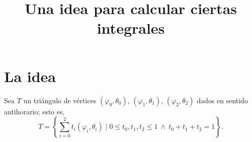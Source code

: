 \documentclass[reqno]{amsart}
\begin{document}
\title{Una idea para calcular ciertas integrales}
\maketitle

\section{La idea}

Sea $T$ un triángulo de vértices $(\varphi_0, \theta_0)$, $(\varphi_1, \theta_1)$, $(\varphi_2, \theta_2)$ dados en sentido antihorario; esto es,
%
\begin{equation}\label{T}
T = \left\{ \sum_{i=0}^2 t_i (\varphi_i, \theta_i) \mid 0 \leq t_0, t_1, t_2 \leq 1 \ \wedge \ t_0+t_1+t_2=1 \right\}.
\end{equation}
%
\end{document}
